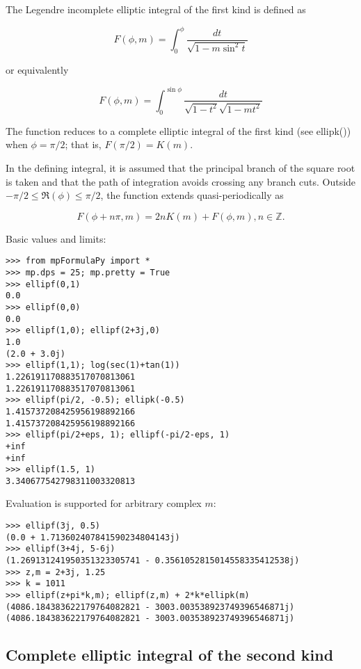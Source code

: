 \vpara
The Legendre incomplete elliptic integral of the first kind is defined as

\begin{equation}
F(\phi,m)=\int_0^{\phi} \frac{dt}{\sqrt{1-m \sin^2 t}} 
\end{equation}

or equivalently

\begin{equation}
F(\phi,m)=\int_0^{\sin \phi} \frac{dt}{\sqrt{1-t^2}\sqrt{1-mt^2}} 
\end{equation}


The function reduces to a complete elliptic integral of the first kind (see ellipk()) when $\phi=\pi/2$; that is, $F(\pi/2) = K(m)$.

In the defining integral, it is assumed that the principal branch of the square root is taken and that the path of integration avoids crossing any branch cuts. Outside $-\pi/2 \leq \Re(\phi) \leq \pi/2$, the function extends quasi-periodically as

\begin{equation}
F(\phi+n\pi,m) = 2nK(m) + F(\phi,m), n \in \mathbb{Z}.
\end{equation}

Basic values and limits:

\begin{lstlisting}
>>> from mpFormulaPy import *
>>> mp.dps = 25; mp.pretty = True
>>> ellipf(0,1)
0.0
>>> ellipf(0,0)
0.0
>>> ellipf(1,0); ellipf(2+3j,0)
1.0
(2.0 + 3.0j)
>>> ellipf(1,1); log(sec(1)+tan(1))
1.226191170883517070813061
1.226191170883517070813061
>>> ellipf(pi/2, -0.5); ellipk(-0.5)
1.415737208425956198892166
1.415737208425956198892166
>>> ellipf(pi/2+eps, 1); ellipf(-pi/2-eps, 1)
+inf
+inf
>>> ellipf(1.5, 1)
3.340677542798311003320813
\end{lstlisting}

Evaluation is supported for arbitrary complex $m$:

\begin{lstlisting}
>>> ellipf(3j, 0.5)
(0.0 + 1.713602407841590234804143j)
>>> ellipf(3+4j, 5-6j)
(1.269131241950351323305741 - 0.3561052815014558335412538j)
>>> z,m = 2+3j, 1.25
>>> k = 1011
>>> ellipf(z+pi*k,m); ellipf(z,m) + 2*k*ellipk(m)
(4086.184383622179764082821 - 3003.003538923749396546871j)
(4086.184383622179764082821 - 3003.003538923749396546871j)
\end{lstlisting}


\newpage
\subsection{Complete elliptic integral of the second kind}


